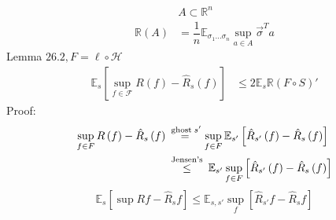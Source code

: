 \documentclass{article}
\begin{document}
\begin{figure}[H] \centering {} \end{figure}
\begin{align*}
&A  \subset \mathbb{R}^{n}
\\ \mathbb{R}\left(A\right) &= \dfrac{1}{n} \mathbb{E}_{\sigma_{1} ... \sigma_{n}} \displaystyle\sup_{a \in A} \vec{\sigma}^{T} a 
\end{align*}
Lemma $26.2, F  = \ell \circ \mathcal{H}$
\begin{align*}
\mathbb{E}_{s} \left[\displaystyle\sup_{f \in \mathcal{F}} R\left(f\right) - \hat{R}_{s}\left(f\right)\right] &\leq  2 \mathbb{E}_{s} \mathbb{R}\left(F \circ S\right)'
\end{align*}
Proof:
\begin{align*}
\displaystyle\sup_{f \in F} R\left(f\right) - \hat{R}_{s}\left(f\right) &\stackrel{\text{\;ghost\;} s'}{=} \displaystyle\sup_{f \in F} \mathbb{E}_{s'}\left[\hat{R}_{s'}\left(f\right) - \hat{R}_{s}\left(f\right)\right]
\\ &\stackrel{\text{\;Jensen's\;}}{\leq} \mathbb{E}_{s'} \displaystyle\sup_{f \in F} \left[\hat{R}_{s'}\left(f\right) - \hat{R}_{s}\left(f\right)\right]
\end{align*}
\begin{equation} \label{equation:radm} 
\mathbb{E}_{s} \left[\displaystyle\sup R f - \hat{R}_{s} f\right] \leq  \mathbb{E}_{s, s'} \displaystyle\sup_{f} \left[\hat{R}_{s'} f - \hat{R}_{s} f\right]
\end{equation}
\end{document}
